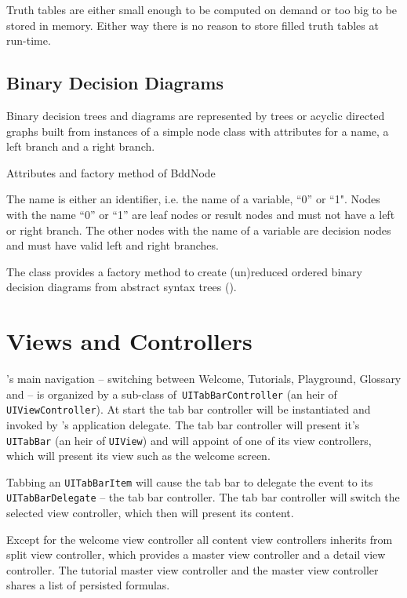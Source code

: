Truth tables are either small enough to be computed on demand or too big to be stored in memory.
Either way there is no reason to store filled truth tables at run-time.

\subsection{Binary Decision Diagrams}

Binary decision trees and diagrams are represented by trees 
or acyclic directed graphs built from instances of a simple node class
 with attributes for a name, a left branch and a right branch. 
\begin{table}[htdp]
\begin{center}
\caption{Attributes and factory method of BddNode}
\label{fig:BddNode}
\end{center}
\end{table}
The name is either an identifier, i.e. the name of a variable, “0” or “1". 
Nodes with the name “0” or “1” are leaf nodes or result nodes
and must not have a left or right branch.
The other nodes with the name of a variable are decision nodes 
and must have valid left and right branches. 

The class provides a factory method to create 
(un)reduced ordered binary decision diagrams from abstract syntax trees
().

\newpage\section{Views and Controllers}

\Nyaya's main navigation – switching between Welcome, Tutorials, Playground, Glossary and \BoolTool – 
is organized by a sub-class of\verb+ UITabBarController+ (an heir of \verb+UIViewController+). 
At start the tab bar controller will be instantiated and invoked by \Nyaya's application delegate. 
The tab bar controller will present it's \verb+UITabBar+ (an heir of \verb+UIView+)
and will appoint of one of its view controllers, which will present its view such as the welcome screen.

Tabbing an \verb+UITabBarItem+ will cause the tab bar to delegate the event to its \verb+UITabBarDelegate+ – the tab bar controller.
The tab bar controller will switch the selected view controller, which then will present its content.

Except for the welcome view controller 
all content view controllers inherits from split view controller,
which provides a master view controller and a detail view controller.
The tutorial master view controller and the \BoolTool master view controller shares a list of persisted formulas.

